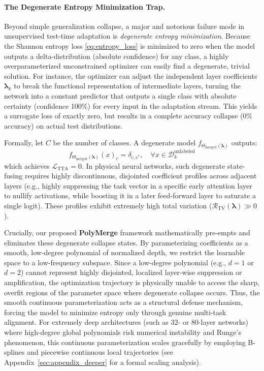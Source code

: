 \paragraph{The Degenerate Entropy Minimization Trap.}
Beyond simple generalization collapse, a major and notorious failure mode in unsupervised test-time adaptation is \emph{degenerate entropy minimization}. Because the Shannon entropy loss \eqref{eq:entropy_loss} is minimized to zero when the model outputs a delta-distribution (absolute confidence) for any class, a highly overparameterized unconstrained optimizer can easily find a degenerate, trivial solution. For instance, the optimizer can adjust the independent layer coefficients $\boldsymbol{\lambda}_k$ to break the functional representation of intermediate layers, turning the network into a constant predictor that outputs a single class with absolute certainty (confidence 100\%) for every input in the adaptation stream. This yields a surrogate loss of exactly zero, but results in a complete accuracy collapse (0\% accuracy) on actual test distributions.

Formally, let $C$ be the number of classes. A degenerate model $f_{\Theta_{\text{merged}}(\boldsymbol{\lambda})}$ outputs:
\begin{equation}
f_{\Theta_{\text{merged}}(\boldsymbol{\lambda})}(x)_c = \delta_{c, c^*}, \quad \forall x \in \mathcal{D}_k^{\text{unlabeled}}
\end{equation}
which achieves $\mathcal{L}_{\text{TTA}} = 0$. In physical neural networks, such degenerate state-fusing requires highly discontinuous, disjointed coefficient profiles across adjacent layers (e.g., highly suppressing the task vector in a specific early attention layer to nullify activations, while boosting it in a later feed-forward layer to saturate a single logit). These profiles exhibit extremely high total variation ($\mathcal{R}_{\text{TV}}(\boldsymbol{\lambda}) \gg 0$).

Crucially, our proposed \textbf{PolyMerge} framework mathematically pre-empts and eliminates these degenerate collapse states. By parameterizing coefficients as a smooth, low-degree polynomial of normalized depth, we restrict the learnable space to a low-frequency subspace. Since a low-degree polynomial (e.g., $d=1$ or $d=2$) cannot represent highly disjointed, localized layer-wise suppression or amplification, the optimization trajectory is physically unable to access the sharp, overfit regions of the parameter space where degenerate collapse occurs. Thus, the smooth continuous parameterization acts as a structural defense mechanism, forcing the model to minimize entropy only through genuine multi-task alignment. For extremely deep architectures (such as 32- or 80-layer networks) where high-degree global polynomials risk numerical instability and Runge's phenomenon, this continuous parameterization scales gracefully by employing B-splines and piecewise continuous local trajectories (see Appendix~\ref{sec:appendix_deeper} for a formal scaling analysis).

